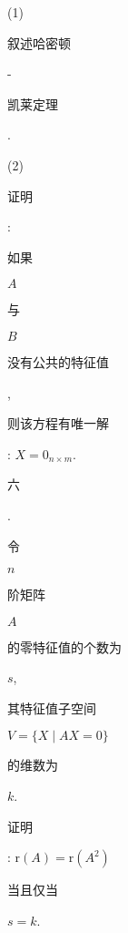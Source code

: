\documentclass[10pt]{article}
\begin{document}
(1) \begin{CJK}{UTF8}{mj}叙述哈密顿\end{CJK}-\begin{CJK}{UTF8}{mj}凯莱定理\end{CJK}.

(2) \begin{CJK}{UTF8}{mj}证明\end{CJK}: \begin{CJK}{UTF8}{mj}如果\end{CJK} $A$ \begin{CJK}{UTF8}{mj}与\end{CJK} $B$ \begin{CJK}{UTF8}{mj}没有公共的特征值\end{CJK}, \begin{CJK}{UTF8}{mj}则该方程有唯一解\end{CJK}: $X=0_{n \times m}$.

\begin{CJK}{UTF8}{mj}六\end{CJK}. \begin{CJK}{UTF8}{mj}令\end{CJK} $n$ \begin{CJK}{UTF8}{mj}阶矩阵\end{CJK} $A$ \begin{CJK}{UTF8}{mj}的零特征值的个数为\end{CJK} $s$, \begin{CJK}{UTF8}{mj}其特征值子空间\end{CJK} $V=\{X \mid A X=0\}$ \begin{CJK}{UTF8}{mj}的维数为\end{CJK} $k$. \begin{CJK}{UTF8}{mj}证明\end{CJK}: $\mathrm{r}(A)=\mathrm{r}\left(A^{2}\right)$ \begin{CJK}{UTF8}{mj}当且仅当\end{CJK} $s=k$.
\end{document}

